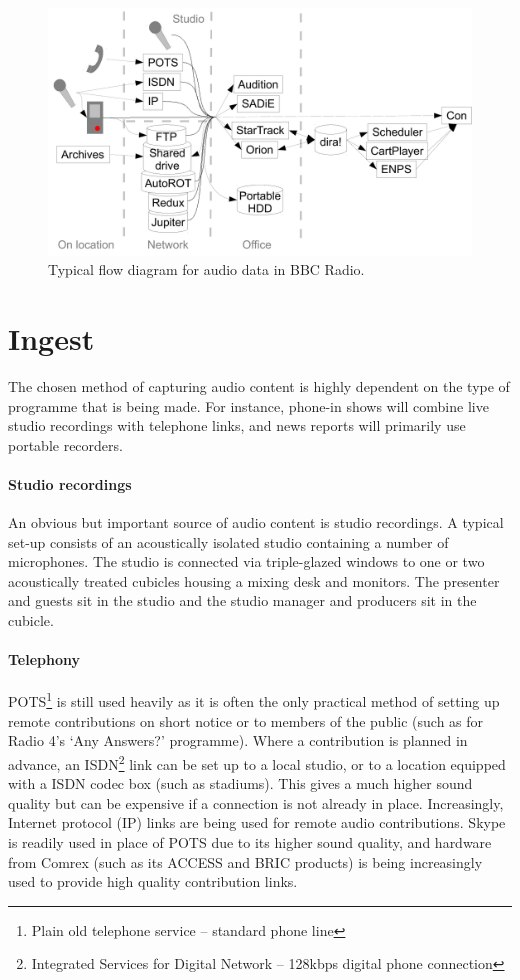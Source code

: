 \begin{figure}[ht]
\centering
\includegraphics[width=\textwidth]{figs/workflow.pdf}
\caption{Typical flow diagram for audio data in BBC Radio.}
\label{fig:workflow}
\end{figure}

\section{Ingest}\label{sec:ingest}
The chosen method of capturing audio content is highly dependent on the type of
programme that is being made. For instance, phone-in shows will combine live
studio recordings with telephone links, and news reports will primarily use
portable recorders. 

\paragraph{Studio recordings}
An obvious but important source of audio content is studio recordings. A
typical set-up consists of an acoustically isolated studio containing a number
of microphones. The studio is connected via triple-glazed windows to one or two
acoustically treated cubicles housing a mixing desk and monitors. The presenter
and guests sit in the studio and the studio manager and producers sit in the
cubicle.

\paragraph{Telephony}
POTS\footnote{Plain old telephone service -- standard phone line} is still used
heavily as it is often the only practical method of setting up remote
contributions on short notice or to members of the public (such as for Radio
4's `Any Answers?' programme).  Where a contribution is planned in advance, an
ISDN\footnote{Integrated Services for Digital Network -- 128kbps digital phone
  connection} link can be set up to a local studio, or to a location equipped
with a ISDN codec box (such as stadiums). This gives a much higher sound
quality but can be expensive if a connection is not already in place.
Increasingly, Internet protocol (IP) links are being used for remote audio
contributions.  Skype is readily used in place of POTS due to its higher sound
quality, and hardware from Comrex (such as its ACCESS and BRIC products) is
being increasingly used to provide high quality contribution links.

